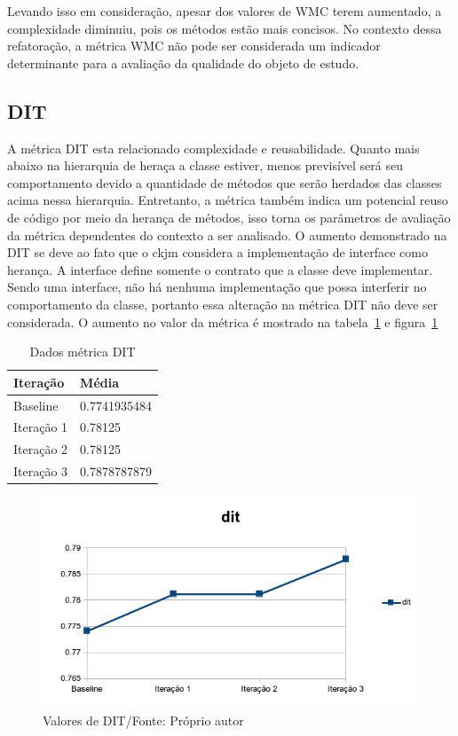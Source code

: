 Levando isso em consideração, apesar dos valores de WMC
terem aumentado, a complexidade diminuiu, pois os métodos estão mais concisos.
No contexto dessa refatoração, a métrica WMC não pode ser considerada um
indicador determinante para a avaliação da qualidade do objeto de estudo.


\subsection{DIT}

A métrica DIT esta relacionado complexidade e reusabilidade. Quanto mais abaixo
na hierarquia de heraça a classe estiver, menos previsível será seu
comportamento devido a quantidade de métodos que serão herdados das classes
acima nessa hierarquia. Entretanto, a métrica também indica um potencial reuso
de código por meio da herança de métodos, isso torna os parâmetros de avaliação
da métrica dependentes do contexto a ser analisado. O aumento demonstrado na DIT
se deve ao fato que o ckjm considera a implementação de interface como herança.
A interface define somente o contrato que a classe deve implementar. Sendo uma
interface, não há nenhuma implementação que possa interferir no comportamento
da classe, portanto essa alteração na métrica DIT não deve ser considerada. O
aumento no valor da métrica é mostrado na tabela~\ref{tab:dit} e
figura~\ref{fig:dit}

\begin{table}[h]
	\centering
	    \caption{Dados métrica DIT}
    \begin{tabular}{ | l | l | }
    \hline
    Iteração & Média 			\\ \hline
    Baseline & 0.7741935484  	\\ \hline
    Iteração 1 & 0.78125		\\ \hline
	Iteração 2 & 0.78125			\\ \hline
	Iteração 3 & 0.7878787879	\\ \hline
    \end{tabular}
    \label{tab:dit}
\end{table}

\begin{figure}[h]
	\centering
	\includegraphics{img/dit.png}
	\caption{Valores de DIT/Fonte: Próprio autor}
	\label{fig:dit}
\end{figure}


